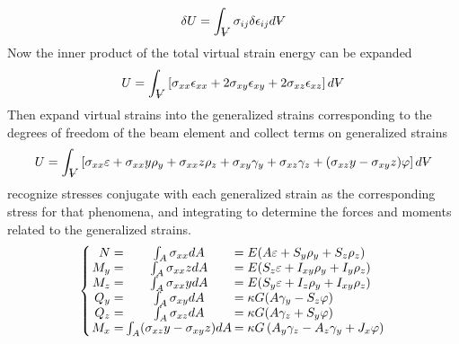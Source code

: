 \begin{equation}\label{eq:TotalVirtualStrainEnergyExpression}
\delta U = \int_{\volume}\sigma_{ij}\delta\epsilon_{ij}d\volume
\end{equation}
Now the inner product of the total virtual strain energy can be expanded
\begin{equation}\label{eq:TotalStrainEnergyExpanded}
U=\int_{\volume}\left[\sigma_{xx}\epsilon_{xx}+2\sigma_{xy}\epsilon_{xy}+2\sigma_{xz}\epsilon_{xz}\right]d\volume
\end{equation}
Then expand virtual strains into the generalized strains corresponding to the degrees of freedom of the beam element and collect terms on generalized strains
\begin{equation}\label{eq:TotalStrainEnergyGeneralized}
 U=\int_{\volume}\left[\sigma_{xx}\varepsilon+\sigma_{xx}y\rho_y+\sigma_{xx}z\rho_z+\sigma_{xy}\gamma_y+\sigma_{xz}\gamma_z+(\sigma_{xz}y-\sigma_{xy}z)\varphi\right]d\volume
\end{equation}
recognize stresses conjugate with each generalized strain as the corresponding stress for that phenomena, and integrating to determine the forces and moments related to the generalized strains.
\begin{equation}\label{eq:generalizedForces}
\left\{\arraycolsep=1pt\begin{array}{rcl}
N=&\int_A\sigma_{xx}dA&=E( A\varepsilon+S_y\rho_y+S_z\rho_z)\\
M_y=&\int_A\sigma_{xx}zdA&=E(S_z\varepsilon+I_{xy}\rho_y+I_y\rho_z)\\
M_z=&\int_A\sigma_{xx}ydA&=E(S_y\varepsilon+I_z\rho_y+I_{xy}\rho_z)\\
Q_y=&\int_A\sigma_{xy}dA&=\kappa G(A\gamma_y-S_z\varphi)\\
Q_z=&\int_A\sigma_{xz}dA&=\kappa G(A\gamma_z+S_y\varphi)\\
M_x=&\int_A(\sigma_{xz}y-\sigma_{xy}z)dA&=\kappa G\left(A_y\gamma_z-A_z\gamma_y+J_x\varphi\right)
\end{array}\right.
\end{equation}
